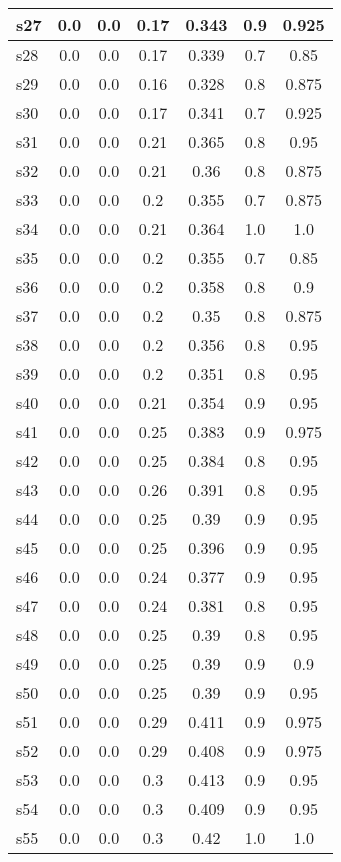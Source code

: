 \documentclass{article}
\begin{document}
\begin{tabular}{|l|c|c|c|c|c|c|}
\hline
s27 &0.0 & 0.0 & 0.17 & 0.343 & 0.9 & 0.925\\
\hline
s28 &0.0 & 0.0 & 0.17 & 0.339 & 0.7 & 0.85\\
\hline
s29 &0.0 & 0.0 & 0.16 & 0.328 & 0.8 & 0.875\\
\hline
s30 &0.0 & 0.0 & 0.17 & 0.341 & 0.7 & 0.925\\
\hline
s31 &0.0 & 0.0 & 0.21 & 0.365 & 0.8 & 0.95\\
\hline
s32 &0.0 & 0.0 & 0.21 & 0.36 & 0.8 & 0.875\\
\hline
s33 &0.0 & 0.0 & 0.2 & 0.355 & 0.7 & 0.875\\
\hline
s34 &0.0 & 0.0 & 0.21 & 0.364 & 1.0 & 1.0\\
\hline
s35 &0.0 & 0.0 & 0.2 & 0.355 & 0.7 & 0.85\\
\hline
s36 &0.0 & 0.0 & 0.2 & 0.358 & 0.8 & 0.9\\
\hline
s37 &0.0 & 0.0 & 0.2 & 0.35 & 0.8 & 0.875\\
\hline
s38 &0.0 & 0.0 & 0.2 & 0.356 & 0.8 & 0.95\\
\hline
s39 &0.0 & 0.0 & 0.2 & 0.351 & 0.8 & 0.95\\
\hline
s40 &0.0 & 0.0 & 0.21 & 0.354 & 0.9 & 0.95\\
\hline
s41 &0.0 & 0.0 & 0.25 & 0.383 & 0.9 & 0.975\\
\hline
s42 &0.0 & 0.0 & 0.25 & 0.384 & 0.8 & 0.95\\
\hline
s43 &0.0 & 0.0 & 0.26 & 0.391 & 0.8 & 0.95\\
\hline
s44 &0.0 & 0.0 & 0.25 & 0.39 & 0.9 & 0.95\\
\hline
s45 &0.0 & 0.0 & 0.25 & 0.396 & 0.9 & 0.95\\
\hline
s46 &0.0 & 0.0 & 0.24 & 0.377 & 0.9 & 0.95\\
\hline
s47 &0.0 & 0.0 & 0.24 & 0.381 & 0.8 & 0.95\\
\hline
s48 &0.0 & 0.0 & 0.25 & 0.39 & 0.8 & 0.95\\
\hline
s49 &0.0 & 0.0 & 0.25 & 0.39 & 0.9 & 0.9\\
\hline
s50 &0.0 & 0.0 & 0.25 & 0.39 & 0.9 & 0.95\\
\hline
s51 &0.0 & 0.0 & 0.29 & 0.411 & 0.9 & 0.975\\
\hline
s52 &0.0 & 0.0 & 0.29 & 0.408 & 0.9 & 0.975\\
\hline
s53 &0.0 & 0.0 & 0.3 & 0.413 & 0.9 & 0.95\\
\hline
s54 &0.0 & 0.0 & 0.3 & 0.409 & 0.9 & 0.95\\
\hline
s55 &0.0 & 0.0 & 0.3 & 0.42 & 1.0 & 1.0\\

\end{tabular}
\end{document}
